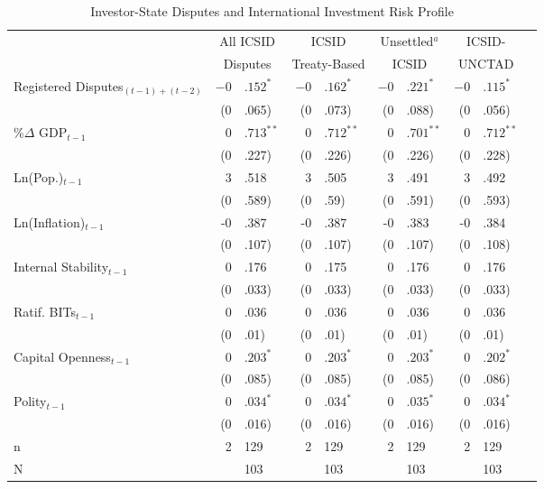 \documentclass[12pt,onesided]{amsart}
\begin{document}
\begin{savenotes}
\begin{table}[ht]
\vspace{3cm}
\centering
\caption{Investor-State Disputes and International Investment Risk Profile}
\label{tab:dispRepLevel}
\begin{tabular}{lr@{} lr@{}lr@{}lr@{}lr@{}}
  \hline\hline
  & \multicolumn{2}{c}{All ICSID} & \multicolumn{2}{c}{ICSID} & \multicolumn{2}{c}{Unsettled$^{a}$} & \multicolumn{2}{c}{ICSID-} \\ 
  & \multicolumn{2}{c}{Disputes} & \multicolumn{2}{c}{Treaty-Based} & \multicolumn{2}{c}{ICSID} & \multicolumn{2}{c}{UNCTAD} \\
 \hline
Registered Disputes$_{(t-1) + (t-2)}$ & $-0$&$.152^{\ast}$ & $-0$&$.162^{\ast}$ & $-0$&$.221^{\ast}$ & $-0$&$.115^{\ast}$ \\ 
   & (0&.065) & (0&.073) & (0&.088) & (0&.056) \\ 
  \%$\Delta$ GDP$_{t-1}$ & $0$&$.713^{\ast\ast}$ & $0$&$.712^{\ast\ast}$ & $0$&$.701^{\ast\ast}$ & $0$&$.712^{\ast\ast}$ \\ 
   & (0&.227) & (0&.226) & (0&.226) & (0&.228) \\ 
  Ln(Pop.)$_{t-1}$ & 3&.518 & 3&.505 & 3&.491 & 3&.492 \\ 
   & (0&.589) & (0&.59) & (0&.591) & (0&.593) \\ 
  Ln(Inflation)$_{t-1}$ & -0&.387 & -0&.387 & -0&.383 & -0&.384 \\ 
   & (0&.107) & (0&.107) & (0&.107) & (0&.108) \\ 
  Internal Stability$_{t-1}$ & 0&.176 & 0&.175 & 0&.176 & 0&.176 \\ 
   & (0&.033) & (0&.033) & (0&.033) & (0&.033) \\ 
  Ratif. BITs$_{t-1}$ & 0&.036 & 0&.036 & 0&.036 & 0&.036 \\ 
   & (0&.01) & (0&.01) & (0&.01) & (0&.01) \\ 
  Capital Openness$_{t-1}$ & $0$&$.203^{\ast}$ & $0$&$.203^{\ast}$ & $0$&$.203^{\ast}$ & $0$&$.202^{\ast}$ \\ 
   & (0&.085) & (0&.085) & (0&.085) & (0&.086) \\ 
  Polity$_{t-1}$ & $0$&$.034^{\ast}$ & $0$&$.034^{\ast}$ & $0$&$.035^{\ast}$ & $0$&$.034^{\ast}$ \\ 
   & (0&.016) & (0&.016) & (0&.016) & (0&.016) \\ 
   \hline
  n & 2&129 & 2&129 & 2&129 & 2&129 \\ 
  N && 103 && 103 && 103 && 103 \\ 

\end{tabular}
\end{table}
\end{savenotes}
\end{document}
